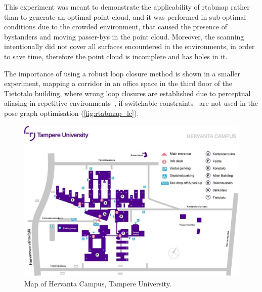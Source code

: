 \documentclass[11pt, letterpaper, twoside]{article}
\begin{document}
This experiment was meant to demonstrate the applicability of \gls{rtabmap}
rather than to generate an optimal point cloud, and it was performed in
sub-optimal conditions due to the crowded environment, that caused the presence
of bystanders and moving passer-bys in the point cloud. Moreover, the scanning
intentionally did not cover all surfaces encountered in the environments, in
order to save time, therefore the point cloud is incomplete and has holes in
it.

The importance of using a robust loop closure method is shown in a smaller
experiment, mapping a corridor in an office space in the third floor of the
Tietotalo building, where wrong loop closures are established due to perceptual
aliasing in repetitive environments~\cite{lajoie2019modeling}, if switchable
constraints~\cite{sunderhauf2012switchable} are not used in the pose graph
optimisation (\cref{fig:rtabmap_lc}).

\begin{figure}[tb]
    \centering
    \includegraphics[width=0.9\linewidth]{campus_map.jpg}
    \caption{Map of Hervanta Campus, Tampere University.}\label{fig:campus_map}
\end{figure}
\end{document}
